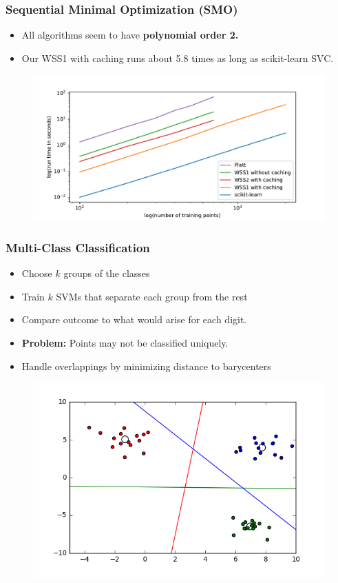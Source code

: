 \documentclass[12pt, compress]{beamer}
\newcommand{\titleC}{Sequential Minimal Optimization (SMO)}
\newcommand{\titleD}{Multi-Class Classification}
\begin{document}
\begin{frame}
\frametitle{\titleC}
\begin{itemize}
	\item All algorithms seem to have \textbf{\alert{polynomial order 2.}}
	\item Our WSS1 with caching runs about 5.8 times as long as scikit-learn SVC.
\end{itemize}
\begin{figure}[h]
	\includegraphics[width=1\textwidth, center]{images_for_presentation/benchplot_gauss_loglog.pdf}
	\label{bench_gauss}
\end{figure}
\end{frame}
          

\begin{frame}
  \frametitle{\titleD}
	\begin{itemize}
		\item Choose $k$ groups of the classes
		\item Train $k$ SVMs that separate each group from the rest
		\item Compare outcome to what would arise for each digit.
		\item \textbf{\alert{Problem:}} Points may not be classified uniquely.
		\item Handle overlappings by minimizing distance to barycenters
	\end{itemize}

	\begin{figure}[h]
		\includegraphics[width=.6\textwidth]{onevsall_examplegraphic}
	\end{figure}
\end{frame}
\end{document}
